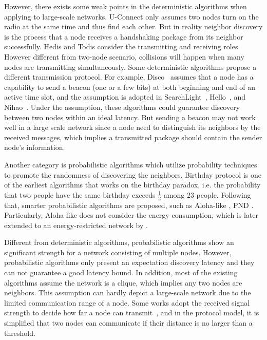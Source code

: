 However, there exists some weak points in the deterministic algorithms when applying to large-scale networks.
U-Connect \cite{kandhalu2010u} only assumes two nodes turn on the radio at the same time and thus find each other. 
But in reality neighbor discovery is the process that a node receives a handshaking package from its neighbor successfully. 
Hedis and Todis \cite{chen2015heterogeneous} consider the transmitting and receiving roles.
However different from two-node scenario, collisions will happen when many nodes are transmitting simultaneously. 
Some deterministic algorithms propose a different transmission protocol.
For example, Disco~\cite{dutta2008practical} assumes that a node has a capability to send a beacon (one or a few bits) at both beginning and end of an active time slot, and the assumption is adopted in 
SearchLight~\cite{bakht2012searchlight}, Hello~\cite{sun2014hello}, and Nihao~\cite{qiu2016talk}.
Under the assumption, these algorithms could guarantee discovery between two nodes within an ideal latency. But sending a beacon may not work well in a large scale network since a node need to distinguish its neighbors by the received messages, which implies a transmitted package should contain the sender node's information\cite{zhou2004impact}. 


Another category is probabilistic algorithms \cite{mcglynn2001birthday,
vasudevan2009neighbor,you2011aloha,song2014probabilistic} which utilize probability techniques to promote the randomness
of discovering the neighbors. 
Birthday protocol \cite{mcglynn2001birthday} is one of the earliest algorithms that works on the birthday
paradox, i.e. the probability that two people have the same
birthday exceeds $\frac{1}{2}$ among $23$ people. Following that,
smarter probabilistic algorithms are proposed, such as Aloha-like \cite{vasudevan2009neighbor, you2011aloha}, PND \cite{song2014probabilistic}. Particularly, Aloha-like \cite{vasudevan2009neighbor} does not consider the energy consumption, which is later extended to an energy-restricted network by \cite{you2011aloha}.

Different from deterministic algorithms,
probabilistic algorithms show an significant strength for a network consisting of multiple nodes.
However, probabilistic algorithms only present an expectation discovery latency and they
can not guarantee a good latency bound.
In addition, most of the existing algorithms assume the network is a clique, which implies any two nodes are neighbors. 
This assumption can hardly depict a large-scale network due to the limited communication range of a node.
Some works adopt the received signal strength to decide how far a node can transmit~\cite{daiya2011experimental}, and in the protocol model, it is simplified that two nodes can communicate if their distance is no larger than a threshold.







